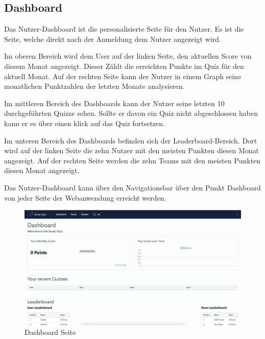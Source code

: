 \subsection*{Dashboard}

Das Nutzer-Dashboard ist die personalisierte Seite für den Nutzer.
Es ist die Seite, welche direkt nach der Anmeldung dem Nutzer angezeigt wird. \newline

\noindent Im oberen Bereich wird dem User auf der linken Seite, den aktuellen Score von diesem
Monat angezeigt. Dieser Zählt die erreichten Punkte im Quiz für den aktuell Monat. 
Auf der rechten Seite kann der Nutzer in einem Graph seine monatlichen Punktzahlen der letzten
Monate analysieren.\newline

\noindent Im mittleren Bereich des Dashboards kann der Nutzer seine letzten 10 durchgeführten
Quizze sehen. Sollte er davon ein Quiz nicht abgeschlossen haben kann er es über einen klick auf
das Quiz fortsetzen. \newline

\noindent Im unteren Bereich des Dashboards befinden sich der Leaderboard-Bereich. 
Dort wird auf der linken Seite die zehn Nutzer mit den meisten Punkten diesen Monat angezeigt.
Auf der rechten Seite werden die zehn Teams mit den meisten Punkten diesen Monat angezeigt. \newline

\noindent Das Nutzer-Dashboard kann über den Navigationsbar über den Punkt Dashboard von
jeder Seite der Webanwendung erreicht werden.

\begin{figure}[H]
  \includegraphics[width=\linewidth]{img/dashboard.png}
  \caption{Dashboard Seite}
  \label{fig:dashboard}
\end{figure}

